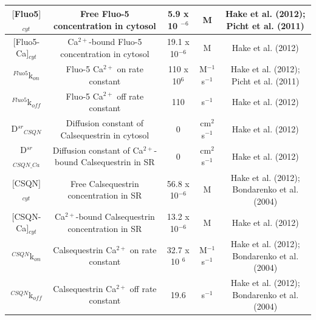 \documentclass[12pt]{ucsddissertation}
\begin{document}
\begin{table}[h]
{\begin{tabular}{ccccc}
\hline
$[$Fluo5$]$$_{cyt}$ & Free Fluo-5 concentration in cytosol & 5.9 x 10
$^{-6}$ & M & Hake et al. (2012); Picht et al. (2011) \\
\hline
$[$Fluo5-Ca$]$$_{cyt}$ & Ca$^{2+}$-bound Fluo-5 concentration in 
cytosol & 19.1 x 10$^{-6}$ & M & Hake et al. (2012) \\
\hline
$^{Fluo5}$k$_{on}$ & Fluo-5 Ca$^{2+}$ on rate constant & 110 x 10$^{6
}$ & M$^{-1}$s$^{-1}$ & Hake et al. (2012); Picht et al. (2011) 
\\
\hline
$^{Fluo5}$k$_{off}$ & Fluo-5 Ca$^{2+}$ off rate constant & 110 & s$^{
-1}$ & Hake et al. (2012) \\
\hline
D$^{sr}$$_{CSQN}$ & Diffusion constant of Calsequestrin in cytosol 
& 0 & cm$^{2}$s$^{-1}$ & Hake et al. (2012) \\
\hline
D$^{sr}$$_{CSQN\_Ca}$ & Diffusion constant of Ca$^{2+}$-bound 
Calsequestrin in SR & 0 & cm$^{2}$s$^{-1}$ & Hake et al. (2012) 
\\
\hline
$[$CSQN$]$$_{cyt}$ & Free Calsequestrin concentration in SR & 56.8 x 
10$^{-6}$ & M & Hake et al. (2012); Bondarenko et al. (2004) \\
\hline
$[$CSQN-Ca$]$$_{cyt}$ & Ca$^{2+}$-bound Calsequestrin 
concentration in SR & 13.2 x 10$^{-6}$ & M & Hake et al. (2012) \\
\hline
$^{CSQN}$k$_{on}$ & Calsequestrin Ca$^{2+}$ on rate constant & 32.7 x 10
$^{6}$ & M$^{-1}$s$^{-1}$ & Hake et al. (2012); Bondarenko et 
al. (2004) \\
\hline
$^{CSQN}$k$_{off}$ & Calsequestrin Ca$^{2+}$ off rate constant & 19.6 & 
s$^{-1}$ & Hake et al. (2012); Bondarenko et al. (2004) \\
\hline
\end{tabular}}
\end{table}
\end{document}
